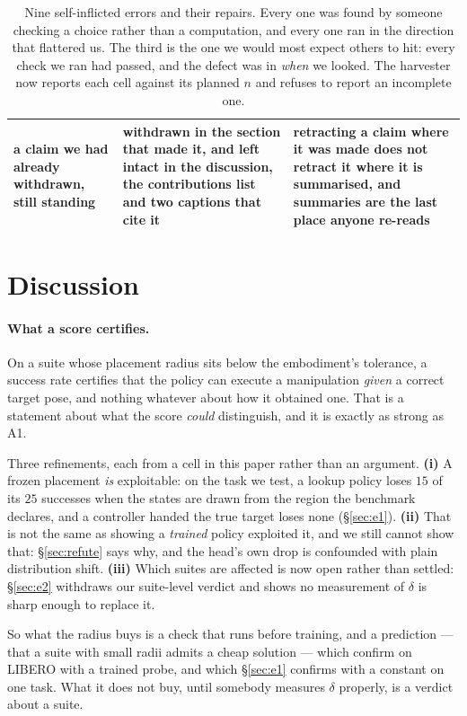 \documentclass[10pt,twocolumn]{article}
\begin{document}
\begin{table}[h]
\begin{tabular}{p{1.75cm}p{2.2cm}p{2.95cm}}
\addlinespace
a claim we had already withdrawn, still standing &
withdrawn in the section that made it, and left intact in the discussion, the
contributions list and two captions that cite it &
\textbf{retracting a claim where it was made does not retract it where it is
summarised}, and summaries are the last place anyone re-reads \\
\bottomrule
\end{tabular}
\caption{Nine self-inflicted errors and their repairs. Every one was found by
someone checking a choice rather than a computation, and every one ran in the
direction that flattered us. The third is the one we would most expect others
to hit: every check we ran had passed, and the defect
was in \emph{when} we looked. The harvester now reports each cell against its
planned $n$ and refuses to report an incomplete one.}
\label{tab:fooled}
\end{table}

\section{Discussion}

\paragraph{What a score certifies.} On a suite whose placement radius sits
below the embodiment's tolerance, a success rate certifies that the policy can
execute a manipulation \emph{given} a correct target pose, and nothing
whatever about how it obtained one. That is a statement about what the score
\emph{could} distinguish, and it is exactly as strong as A1.

Three refinements, each from a cell in this paper rather than an argument.
\textbf{(i)} A frozen placement \emph{is} exploitable: on the task we test, a
lookup policy loses $15$ of its $25$ successes when the states are drawn from
the region the benchmark declares, and a controller handed the true target
loses none (\S\ref{sec:e1}). \textbf{(ii)} That is not the same as showing a
\emph{trained} policy exploited it, and we still cannot show that:
\S\ref{sec:refute} says why, and the head's own drop is confounded with plain
distribution shift. \textbf{(iii)} Which suites are affected is now open rather
than settled: \S\ref{sec:e2} withdraws our suite-level verdict and shows no
measurement of $\delta$ is sharp enough to replace it.

So what the radius buys is a check that runs before training, and a prediction
--- that a suite with small radii admits a cheap solution --- which
\citet{jiang2026benchmarking} confirm on LIBERO with a trained probe, and which
\S\ref{sec:e1} confirms with a constant on one task. What it does not buy,
until somebody measures $\delta$ properly, is a verdict about a suite.
\end{document}
